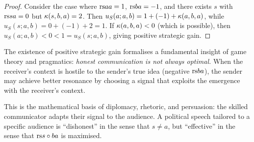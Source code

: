 \begin{proof}
Consider the case where $\mathrm{rs}{a}{a} = 1$, $\mathrm{rs}{b}{a} = -1$, and there
exists $s$ with $\mathrm{rs}{s}{a} = 0$ but $\kappa(s, b, a) = 2$.  Then
$u_S(a; a, b) = 1 + (-1) + \kappa(a, b, a)$, while
$u_S(s; a, b) = 0 + (-1) + 2 = 1$.
If $\kappa(a, b, a) < 0$ (which is possible), then $u_S(a; a, b) < 0 < 1
= u_S(s; a, b)$, giving positive strategic gain.
\end{proof}

\begin{interpretation}
The existence of positive strategic gain formalises a fundamental insight of
game theory and pragmatics: \emph{honest communication is not always optimal.}
When the receiver's context is hostile to the sender's true idea (negative
$\mathrm{rs}{b}{a}$), the sender may achieve better resonance by choosing a signal
that exploits the emergence with the receiver's context.

This is the mathematical basis of diplomacy, rhetoric, and persuasion: the
skilled communicator adapts their signal to the audience.  A political
speech tailored to a specific audience is ``dishonest'' in the sense that
$s \neq a$, but ``effective'' in the sense that $\mathrm{rs}{s \circ b}{a}$
is maximised.
\end{interpretation}

